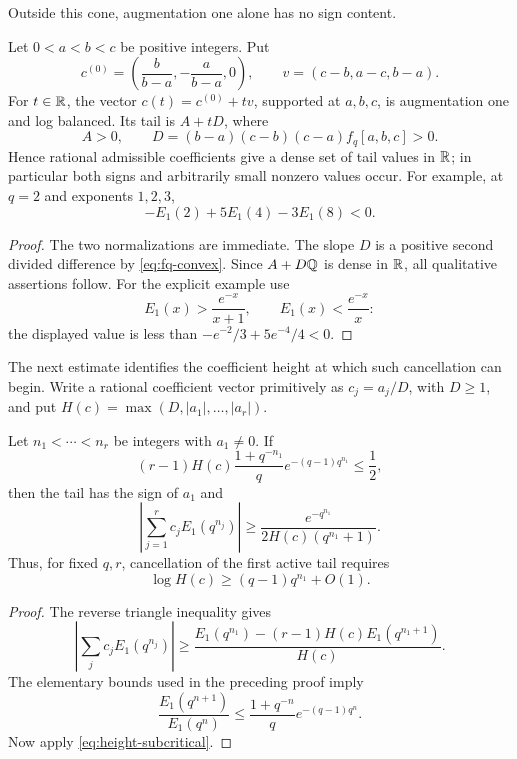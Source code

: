 Outside this cone, augmentation one alone has no sign content.

\begin{proposition}
\label{prop:three-point-flexibility}
Let \(0<a<b<c\) be positive integers.  Put
\[
 c^{(0)}=\left(\frac b{b-a},-\frac a{b-a},0\right),
 \qquad
 v=(c-b,a-c,b-a).
\]
For \(t\in\mathbb R\), the vector \(c(t)=c^{(0)}+tv\), supported at \(a,b,c\),
is augmentation one and log balanced.  Its tail is \(A+tD\), where
\[
 A>0,
 \qquad
 D=(b-a)(c-b)(c-a)f_q[a,b,c]>0.
\]
Hence rational admissible coefficients give a dense set of tail values in
\(\mathbb R\); in particular both signs and arbitrarily small nonzero values occur.
For example, at \(q=2\) and exponents \(1,2,3\),
\[
 -E_1(2)+5E_1(4)-3E_1(8)<0.
\]
\end{proposition}

\begin{proof}
The two normalizations are immediate.  The slope \(D\) is a positive second
divided difference by \eqref{eq:fq-convex}.  Since \(A+D\mathbb Q\) is dense in
\(\mathbb R\), all qualitative assertions follow.  For the explicit example use
\[
 E_1(x)>\frac{e^{-x}}{x+1},
 \qquad
 E_1(x)<\frac{e^{-x}}x:
\]
the displayed value is less than
\(-e^{-2}/3+5e^{-4}/4<0\).
\end{proof}

The next estimate identifies the coefficient height at which such
cancellation can begin.  Write a rational coefficient vector primitively as
\(c_j=a_j/D\), with \(D\ge1\), and put
\(H(c)=\max(D,|a_1|,\ldots,|a_r|)\).

\begin{proposition}
\label{prop:first-tail-dominance}
Let \(n_1<\cdots<n_r\) be integers with \(a_1\ne0\).  If
\begin{equation}\label{eq:height-subcritical}
 (r-1)H(c)\frac{1+q^{-n_1}}q
 e^{-(q-1)q^{n_1}}\le\frac12,
\end{equation}
then the tail has the sign of \(a_1\) and
\begin{equation}\label{eq:first-tail-lower}
 \boxed{\displaystyle
 \left|\sum_{j=1}^rc_jE_1(q^{n_j})\right|
 \ge\frac{e^{-q^{n_1}}}{2H(c)(q^{n_1}+1)}.}
\end{equation}
Thus, for fixed \(q,r\), cancellation of the first active tail requires
\[
 \log H(c)\ge(q-1)q^{n_1}+O(1).
\]
\end{proposition}

\begin{proof}
The reverse triangle inequality gives
\[
 \left|\sum_jc_jE_1(q^{n_j})\right|
 \ge\frac{E_1(q^{n_1})-(r-1)H(c)E_1(q^{n_1+1})}{H(c)}.
\]
The elementary bounds used in the preceding proof imply
\[
 \frac{E_1(q^{n+1})}{E_1(q^n)}
 \le\frac{1+q^{-n}}q e^{-(q-1)q^n}.
\]
Now apply \eqref{eq:height-subcritical}.
\end{proof}

